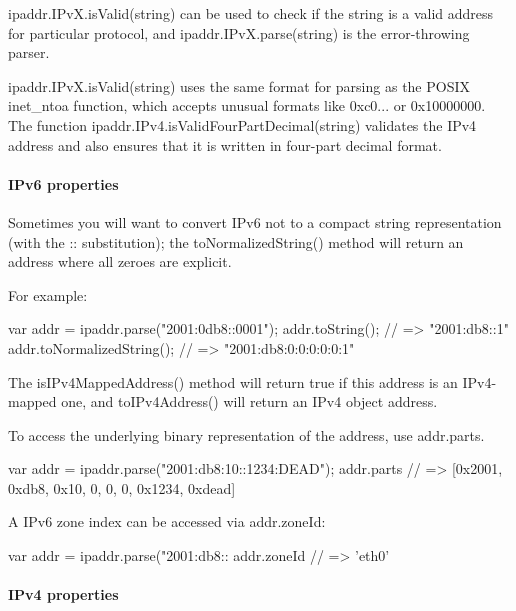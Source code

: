 {\ttfamily ipaddr.\+I\+Pv\+X.\+is\+Valid(string)} can be used to check if the string is a valid address for particular protocol, and {\ttfamily ipaddr.\+I\+Pv\+X.\+parse(string)} is the error-\/throwing parser.

{\ttfamily ipaddr.\+I\+Pv\+X.\+is\+Valid(string)} uses the same format for parsing as the P\+O\+S\+IX {\ttfamily inet\+\_\+ntoa} function, which accepts unusual formats like {\ttfamily 0xc0...} or {\ttfamily 0x10000000}. The function {\ttfamily ipaddr.\+I\+Pv4.\+is\+Valid\+Four\+Part\+Decimal(string)} validates the I\+Pv4 address and also ensures that it is written in four-\/part decimal format.

\paragraph*{I\+Pv6 properties}

Sometimes you will want to convert I\+Pv6 not to a compact string representation (with the {\ttfamily \+:\+:} substitution); the {\ttfamily to\+Normalized\+String()} method will return an address where all zeroes are explicit.

For example\+:


\begin{DoxyCode}
var addr = ipaddr.parse("2001:0db8::0001");
addr.toString(); // => "2001:db8::1"
addr.toNormalizedString(); // => "2001:db8:0:0:0:0:0:1"
\end{DoxyCode}


The {\ttfamily is\+I\+Pv4\+Mapped\+Address()} method will return {\ttfamily true} if this address is an I\+Pv4-\/mapped one, and {\ttfamily to\+I\+Pv4\+Address()} will return an I\+Pv4 object address.

To access the underlying binary representation of the address, use {\ttfamily addr.\+parts}.


\begin{DoxyCode}
var addr = ipaddr.parse("2001:db8:10::1234:DEAD");
addr.parts // => [0x2001, 0xdb8, 0x10, 0, 0, 0, 0x1234, 0xdead]
\end{DoxyCode}


A I\+Pv6 zone index can be accessed via {\ttfamily addr.\+zone\+Id}\+:


\begin{DoxyCode}
var addr = ipaddr.parse("2001:db8::%
addr.zoneId // => 'eth0'
\end{DoxyCode}


\paragraph*{I\+Pv4 properties}

